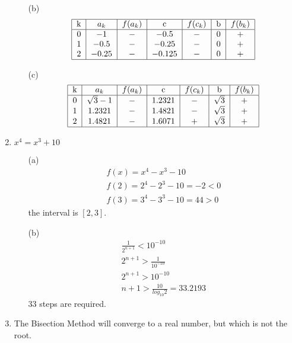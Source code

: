 \documentclass[UTF8]{ctexart}
\begin{document}
\begin{enumerate}
\begin{itemize}
\item[(b)]
\[
\begin{tabular}{|r|c|c|c|c|c|c|}
\hline
k & $a_k$ & $f(a_k)$ & c       & $f(c_k)$ & b    & $f(b_k)$ \\
\hline
0 & $-1$  & $-$      & $-0.5$  & $-$      & 0    & $+$ \\
1 & $-0.5$& $-$      & $-0.25$ & $-$      & 0    & $+$ \\
2 & $-0.25$ & $-$    & $-0.125$& $-$      & 0    & $+$ \\
\hline
\end{tabular}
\]

\item[(c)]
\[
\begin{tabular}{|r|c|c|c|c|c|c|}
\hline
k & $a_k$         & $f(a_k)$ & c       & $f(c_k)$ & b    & $f(b_k)$ \\
\hline
0 & $\sqrt{3}-1$  & $-$      & $1.2321$& $-$      & $\sqrt{3}$  & $+$ \\
1 & $1.2321$      & $-$      & $1.4821$& $-$      & $\sqrt{3}$  & $+$ \\
2 & $1.4821$      & $-$      & $1.6071$& $+$      & $\sqrt{3}$  & $+$ \\
\hline
\end{tabular}
\]

\end{itemize}

\item $x^4 = x^3 + 10$
\begin{itemize}
\item[(a)]
\begin{gather*}
f(x) = x^4 - x^3 - 10 \\
f(2) = 2^4 - 2^3 - 10 = -2 < 0 \\
f(3) = 3^4 - 3^3 - 10 = 44 > 0
\end{gather*}
the interval is $[2,3]$.

\item[(b)]
\begin{gather*}
\frac{1}{2^{n+1}} < 10^{-10} \\
2^{n+1} > \frac{1}{10^{-10}} \\
2^{n+1} > 10^{-10} \\
n+1 > \frac{10}{log_{10}2} = 33.2193
\end{gather*}
33 steps are required.

\end{itemize}
\item
The Bisection Method will converge to a real number, but which is not the root.
\end{enumerate}
\end{document}

